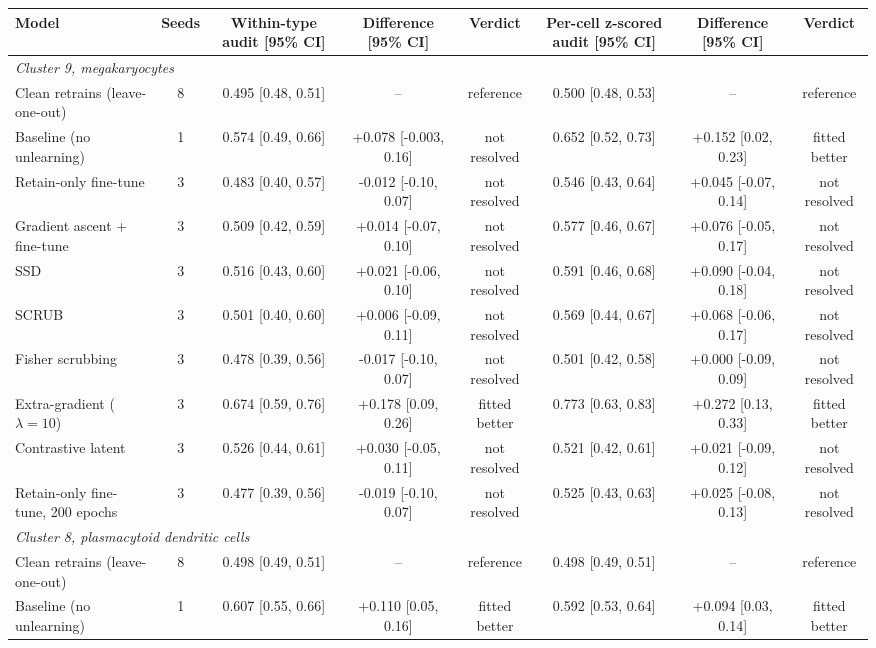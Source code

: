 \begin{tabular}{lccccccc}
\toprule
Model & Seeds & Within-type audit [95\% CI] & Difference [95\% CI] & Verdict & Per-cell z-scored audit [95\% CI] & Difference [95\% CI] & Verdict \\
\midrule
\multicolumn{8}{l}{\emph{Cluster 9, megakaryocytes}} \\
Clean retrains (leave-one-out) & 8 & 0.495 [0.48, 0.51] & -- & reference & 0.500 [0.48, 0.53] & -- & reference \\
Baseline (no unlearning) & 1 & 0.574 [0.49, 0.66] & +0.078 [-0.003, 0.16] & not resolved & 0.652 [0.52, 0.73] & +0.152 [0.02, 0.23] & fitted better \\
Retain-only fine-tune & 3 & 0.483 [0.40, 0.57] & -0.012 [-0.10, 0.07] & not resolved & 0.546 [0.43, 0.64] & +0.045 [-0.07, 0.14] & not resolved \\
Gradient ascent + fine-tune & 3 & 0.509 [0.42, 0.59] & +0.014 [-0.07, 0.10] & not resolved & 0.577 [0.46, 0.67] & +0.076 [-0.05, 0.17] & not resolved \\
SSD & 3 & 0.516 [0.43, 0.60] & +0.021 [-0.06, 0.10] & not resolved & 0.591 [0.46, 0.68] & +0.090 [-0.04, 0.18] & not resolved \\
SCRUB & 3 & 0.501 [0.40, 0.60] & +0.006 [-0.09, 0.11] & not resolved & 0.569 [0.44, 0.67] & +0.068 [-0.06, 0.17] & not resolved \\
Fisher scrubbing & 3 & 0.478 [0.39, 0.56] & -0.017 [-0.10, 0.07] & not resolved & 0.501 [0.42, 0.58] & +0.000 [-0.09, 0.09] & not resolved \\
Extra-gradient ($\lambda=10$) & 3 & 0.674 [0.59, 0.76] & +0.178 [0.09, 0.26] & fitted better & 0.773 [0.63, 0.83] & +0.272 [0.13, 0.33] & fitted better \\
Contrastive latent & 3 & 0.526 [0.44, 0.61] & +0.030 [-0.05, 0.11] & not resolved & 0.521 [0.42, 0.61] & +0.021 [-0.09, 0.12] & not resolved \\
Retain-only fine-tune, 200 epochs & 3 & 0.477 [0.39, 0.56] & -0.019 [-0.10, 0.07] & not resolved & 0.525 [0.43, 0.63] & +0.025 [-0.08, 0.13] & not resolved \\
\midrule
\multicolumn{8}{l}{\emph{Cluster 8, plasmacytoid dendritic cells}} \\
Clean retrains (leave-one-out) & 8 & 0.498 [0.49, 0.51] & -- & reference & 0.498 [0.49, 0.51] & -- & reference \\
Baseline (no unlearning) & 1 & 0.607 [0.55, 0.66] & +0.110 [0.05, 0.16] & fitted better & 0.592 [0.53, 0.64] & +0.094 [0.03, 0.14] & fitted better \\

\end{tabular}
